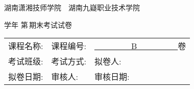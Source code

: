 \documentclass[12pt,twocolumn,landscape,UTF8,twoside]{ctexart}
\author{高星}
\begin{document}
	\noindent	
	
	\begin{spacing}{1.2}
		\begin{center}
			 \heiti 
			湖南潇湘技师学院~~湖南九嶷职业技术学院
			
			\uline{}学年 \hspace{0.5cm} 第\,\uline{}期末考试试卷	
			
			 \songti \vspace{5mm}
			\begin{tabu} to 0.45\textwidth {X[1.3,l]X[1,l]X[0.8,l]}
				
				课程名称:  \uline{}&
				课程编号:\uline{\makebox[20mm][c]{~}} &
				\uline{~~~~~~~~~B~~~~~~~~~~}卷\\ 
				
				考试班级: \uline{}& 
				考试方式:\uline{}& 	
				拟卷人:\uline{ } \\ 
				
				拟卷日期:\uline{}& 
				审核人:\uline{\makebox[25mm][c]{}} & 	
				审核日期:\uline{\makebox[15mm][c]{}} \\ 
			\end{tabu}  
			
			
			 \songti \vspace{5mm}
		\end{center}
	\end{spacing}
	
	\vspace{-8pt} 
\end{document}

